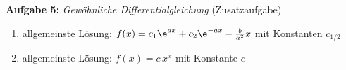 \textbf{Aufgabe 5: } \emph{Gewöhnliche Differentialgleichung} \hfill{(Zusatzaufgabe)}
\begin{enumerate}[label=(\alph*)]
    \item allgemeinste Lösung: $f(x)=c_1\e^{ax}+c_2\e^{-ax}-\frac{b}{a^2}x$ mit Konstanten $c_{1/2}$
    \item allgemeinste Lösung: $f(x)=c\,x^x$ mit Konstante $c$ 
\end{enumerate}

%
%
